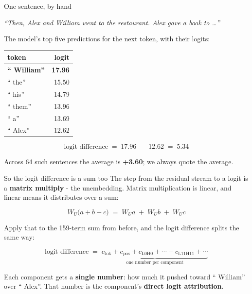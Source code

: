 \documentclass[aspectratio=169]{beamer}
\newcommand{\keybox}[1]{%
  \begin{tcolorbox}[colback=armblue!8, colframe=armblue, boxrule=0.6pt, arc=2pt]
  #1
  \end{tcolorbox}}
\newcommand{\promptbox}[1]{%
  \begin{center}
  \begin{tcolorbox}[colback=lightbg, colframe=gray, boxrule=0.5pt, arc=2pt, width=0.96\textwidth]
    \centering\textit{#1}
  \end{tcolorbox}
  \end{center}}
\begin{document}
\begin{frame}{One sentence, by hand}
  \vspace{0.5em}
  \promptbox{``Then, Alex and William went to the restaurant. Alex gave a book to \ldots''}

  \vspace{0.2em}
  The model's top five predictions for the next token, with their logits:

  \vspace{0.4em}
  \begin{center}
  \small
  \begin{tabular}{@{}lr@{}}
    \toprule
    \textbf{token} & \textbf{logit}\\
    \midrule
    \textcolor{paramgreen}{\textbf{`` William''}} & \textcolor{paramgreen}{\textbf{17.96}}\\
    `` the'' & 15.50\\
    `` his'' & 14.79\\
    `` them'' & 13.96\\
    `` a'' & 13.69\\
    \midrule
    \textcolor{armred}{`` Alex''} & \textcolor{armred}{12.62}\\
    \bottomrule
  \end{tabular}
  \end{center}

  \vspace{0.1em}
  \[
    \text{logit difference} \;=\; 17.96 \;-\; 12.62 \;=\; \mathbf{5.34}
  \]

  \vspace{-0.3em}
  {\footnotesize Across 64 such sentences the average is \textbf{+3.60}; we always quote the
  average.}
\end{frame}

\begin{frame}{So the logit difference is a sum too}
  \vspace{0.8em}
  The step from the residual stream to a logit is a \textbf{matrix multiply} - the unembedding.
  Matrix multiplication is linear, and linear means it distributes over a sum:

  \vspace{0.2em}
  \[
    W_U \big( a + b + c \big) \;=\; W_U a \;+\; W_U b \;+\; W_U c
  \]

  \vspace{0.2em}
  Apply that to the 159-term sum from before, and the logit difference splits the same way:

  \vspace{0.2em}
  \[
    \text{logit difference} \;=\;
      \underbrace{c_{\text{tok}} + c_{\text{pos}} + c_{\text{L0H0}} + \cdots + c_{\text{L11H11}}
      + \cdots}_{\text{one number per component}}
  \]

  \vspace{0.5em}
  \keybox{Each component gets a \textbf{single number}: how much it pushed toward `` William''
  over `` Alex''. That number is the component's \textbf{direct logit attribution}.}
\end{frame}
\end{document}

